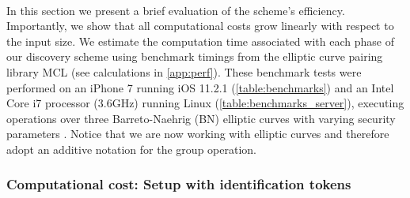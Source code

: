 	\paragraph{} In this section we present a brief evaluation of the scheme's efficiency. Importantly, we show that all computational costs grow linearly with respect to the input size. We estimate the computation time associated with each phase of our discovery scheme using benchmark timings from the elliptic curve pairing library MCL \cite{MCLLib} (see calculations in \autoref{app:perf}). These benchmark tests were performed on an iPhone 7 running iOS 11.2.1 (\autoref{table:benchmarks}) and an Intel Core i7 processor (3.6GHz) running Linux (\autoref{table:benchmarks_server}), executing operations over three Barreto-Naehrig (BN) elliptic curves with varying security parameters \cite{MCLBench}.  Notice that we are now working with elliptic curves and therefore adopt an additive notation for the group operation.
	
	
	
	
	
	\subsubsection{Computational cost: Setup with identification tokens}
	
